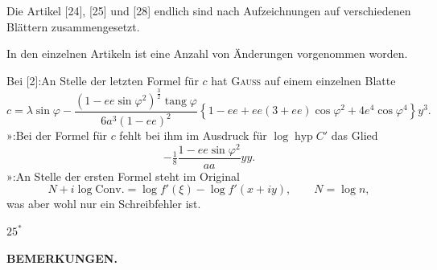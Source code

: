 {Die Artikel [24], [25] und [28] endlich sind nach Aufzeichnungen auf verschiedenen
Blättern zusammengesetzt.

\medskip
In den einzelnen Artikeln ist eine Anzahl von Änderungen vorgenommen worden.

\medskip
\noindent Bei [2]:\quad An Stelle der letzten Formel für \(c\) hat \textsc{Gauss} auf einem einzelnen Blatte
\[
c=\lambda\sin\varphi-
\frac{(1-ee\sin\varphi^2)^{\frac32}\operatorname{tang}\varphi}{6a^3(1-ee)^2}
\left\{1-ee+ee(3+ee)\cos\varphi^2+4e^4\cos\varphi^4\right\}y^3.
\]
\noindent »\quad [4]:\quad Bei der Formel für \(c\) fehlt bei ihm im Ausdruck für \(\log\operatorname{hyp} C'\) das Glied
\[
-\tfrac18\frac{1-ee\sin\varphi^2}{aa}yy.
\]
\noindent »\quad [7]:\quad An Stelle der ersten Formel steht im Original
\[
N+i\log\mathrm{Conv.}=\log f'(\xi)-\log f'(x+iy),\qquad N=\log n,
\]
\noindent\hspace*{3.5em}was aber wohl nur ein Schreibfehler ist.
\par}
\noindent\hfill \(25^{*}\)\hspace*{.12\linewidth}\par

\par\clearpage
\noindent{}\hfill{\small\textbf{BEMERKUNGEN.}}\hfill\null\par\medskip

